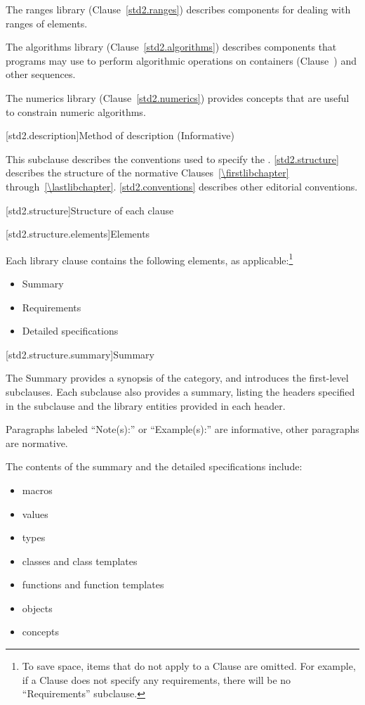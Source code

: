 \pnum
The ranges library (Clause~\ref{std2.ranges}) describes components for dealing with
ranges of elements.

\pnum
The algorithms library (Clause~\ref{std2.algorithms}) describes components that \Cpp
programs may use to perform algorithmic operations on containers
(Clause~) and other sequences.

\pnum
The numerics library (Clause~\ref{std2.numerics}) provides concepts that are useful
to constrain numeric algorithms.

[std2.description]{Method of description (Informative)}

\pnum
This subclause describes the conventions used to specify the . \ref{std2.structure} describes the structure of the normative
Clauses~\ref{\firstlibchapter} through~\ref{\lastlibchapter}. \ref{std2.conventions} describes other editorial conventions.

[std2.structure]{Structure of each clause}

[std2.structure.elements]{Elements}

\pnum
Each library clause contains the following elements, as applicable:\footnote{To
save space, items that do not apply to a Clause are omitted.
For example, if a Clause does not specify any requirements,
there will be no ``Requirements'' subclause.}

\begin{itemize}
\item Summary
\item Requirements
\item Detailed specifications
\end{itemize}

[std2.structure.summary]{Summary}

\pnum
The Summary provides a synopsis of the category, and introduces the first-level subclauses.
Each subclause also provides a summary, listing the headers specified in the
subclause and the library entities provided in each header.

\pnum
Paragraphs labeled ``Note(s):'' or ``Example(s):'' are informative, other paragraphs
are normative.

\pnum
The contents of the summary and the detailed specifications include:

\begin{itemize}
\item macros
\item values
\item types
\item classes and class templates
\item functions and function templates
\item objects
\item concepts
\end{itemize}

